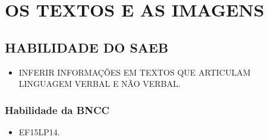 \chapter{OS TEXTOS E AS IMAGENS}

\section*{HABILIDADE DO SAEB}

\begin{itemize}
\item \uppercase{Inferir informações em textos que articulam linguagem verbal e não verbal.}
\end{itemize}

\subsection{Habilidade da BNCC}

\begin{itemize}
\item EF15LP14.
\end{itemize}

